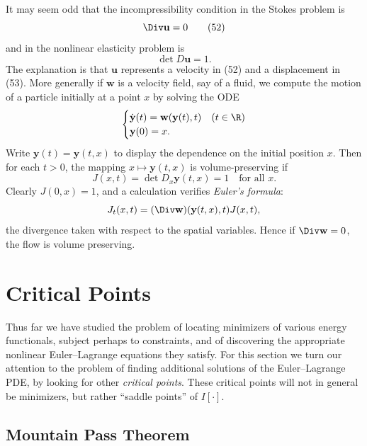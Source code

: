 \begin{remark}
\label{rem:incompressibility-euler-formula}
It may seem odd that the incompressibility condition in the Stokes problem is
\[
\Div \mathbf{u} = 0
\tag{52}
\]
and in the nonlinear elasticity problem is
\[
\det D\mathbf{u} = 1.
\tag{53}
\]
The explanation is that $\mathbf{u}$ represents a velocity in (52) and a displacement in (53). More generally if $\mathbf{w}$ is a velocity field, say of a fluid, we compute the motion of a particle initially at a point $x$ by solving the ODE
\[
\begin{cases}
\dot{\mathbf{y}}(t) = \mathbf{w}(\mathbf{y}(t), t) & (t \in \R) \\
\mathbf{y}(0) = x.
\end{cases}
\]
Write $\mathbf{y}(t) = \mathbf{y}(t, x)$ to display the dependence on the initial position $x$. Then for each $t > 0$, the mapping $x \mapsto \mathbf{y}(t, x)$ is volume-preserving if
\[
J(x, t) = \det D_x \mathbf{y}(t, x) = 1 \quad \text{for all } x.
\]
Clearly $J(0, x) = 1$, and a calculation verifies \textit{Euler's formula}:
\[
J_t(x, t) = (\Div \mathbf{w})(\mathbf{y}(t, x), t)J(x, t),
\]
the divergence taken with respect to the spatial variables. Hence if $\Div \mathbf{w} = 0$, the flow is volume preserving.
\end{remark}

\section{Critical Points}
\label{sec:critical-points-calculus-of-variations}

Thus far we have studied the problem of locating minimizers of various energy functionals, subject perhaps to constraints, and of discovering the appropriate nonlinear Euler--Lagrange equations they satisfy. For this section we turn our attention to the problem of finding additional solutions of the Euler--Lagrange PDE, by looking for other \textit{critical points}. These critical points will not in general be minimizers, but rather ``saddle points'' of $I[\cdot]$.

\subsection{Mountain Pass Theorem}
\label{sec:mountain-pass-theorem-section}

